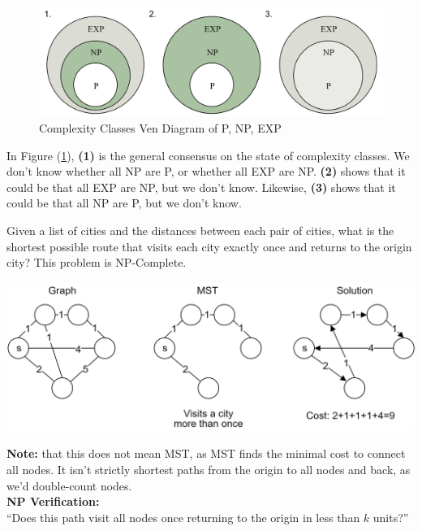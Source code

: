 \begin{figure}[h!]
    \centering
    \includegraphics[width=1\textwidth]{Sections/hard/diagrams.png}
    \caption{Complexity Classes Ven Diagram of P, NP, EXP}
    \label{fig:ven}
\end{figure}

In Figure (\ref{fig:ven}), \textbf{(1)} is the general consensus on the state of complexity classes. We don't know whether 
all NP are P, or whether all EXP are NP. \textbf{(2)} shows that it could be that all EXP are NP, but we don't know. Likewise, \textbf{(3)} shows that it could be that all NP are P, but we don't know.

\newpage 
\begin{theo}

    \label{TSP}

    Given a list of cities and the distances between each pair of cities, 
    what is the shortest possible route that visits each city exactly once and returns to the origin city?
    This problem is NP-Complete. 

    \begin{center}
    \includegraphics[width=1\textwidth]{Sections/hard/graphs.png}
    \end{center}
    \noindent
    \textbf{Note:} that this does not mean MST, as MST finds the minimal cost to connect all nodes. It isn't strictly shortest paths
    from the origin to all nodes and back, as we'd double-count nodes.\\

    \noindent
    \textbf{NP Verification:}\\
    ``Does this path visit all nodes once returning to the origin in less than $k$ units?''

\end{theo}
    
